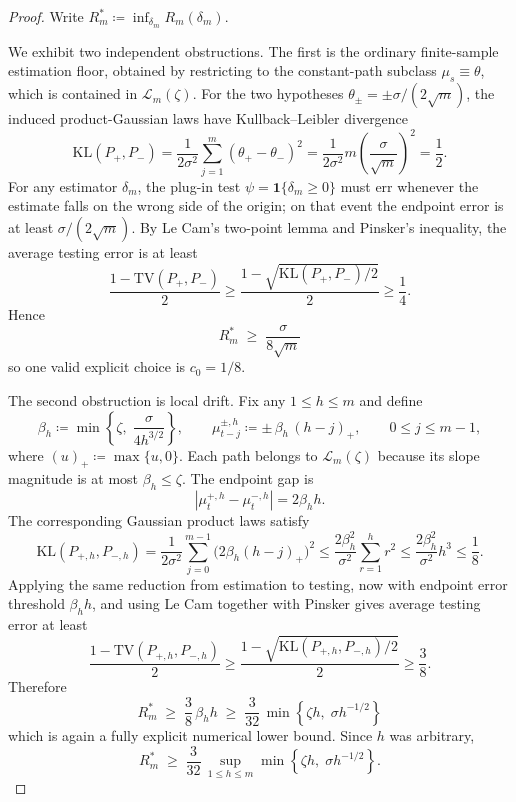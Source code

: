 \begin{proof}
Write $R_m^* \coloneqq \inf_{\delta_m} R_m(\delta_m)$.

We exhibit two independent obstructions. The first is the ordinary
finite-sample estimation floor, obtained by restricting to the constant-path
subclass $\mu_s \equiv \theta$, which is contained in
$\mathcal{L}_m(\zeta)$. For the two hypotheses
$\theta_\pm = \pm \sigma /(2\sqrt{m})$, the induced product-Gaussian laws have
Kullback--Leibler divergence
\[
  \mathrm{KL}(P_+,P_-)
  = \frac{1}{2\sigma^2} \sum_{j=1}^{m} (\theta_+ - \theta_-)^2
  = \frac{1}{2\sigma^2} m\left(\frac{\sigma}{\sqrt{m}}\right)^2
  = \frac{1}{2}.
\]
For any estimator $\delta_m$, the plug-in test $\psi = \mathbf{1}\{\delta_m \geq 0\}$
must err whenever the estimate falls on the wrong side of the origin; on that
event the endpoint error is at least $\sigma /(2\sqrt{m})$. By Le Cam's
two-point lemma and Pinsker's inequality, the average testing error is at least
\[
  \frac{1-\mathrm{TV}(P_+,P_-)}{2}
  \geq
  \frac{1-\sqrt{\mathrm{KL}(P_+,P_-)/2}}{2}
  \geq \frac{1}{4}.
\]
Hence
\[
  R_m^* \;\geq\; \frac{\sigma}{8\sqrt{m}}
\]
so one valid explicit choice is $c_0 = 1/8$.

The second obstruction is local drift. Fix any $1\leq h\leq m$ and define
\[
  \beta_h \coloneqq \min\!\left\{\zeta,\; \frac{\sigma}{4h^{3/2}}\right\},
  \qquad
  \mu^{\pm,h}_{t-j} \coloneqq \pm \,\beta_h\,(h-j)_+,
  \qquad 0\leq j\leq m-1,
\]
where $(u)_+ \coloneqq \max\{u,0\}$. Each path belongs to
$\mathcal{L}_m(\zeta)$ because its slope magnitude is at most $\beta_h \leq
\zeta$. The endpoint gap is
\[
  |\mu_t^{+,h} - \mu_t^{-,h}| = 2\beta_h h.
\]
The corresponding Gaussian product laws satisfy
\[
  \mathrm{KL}(P_{+,h},P_{-,h})
  = \frac{1}{2\sigma^2} \sum_{j=0}^{m-1}
    \bigl(2\beta_h (h-j)_+\bigr)^2
  \leq \frac{2\beta_h^2}{\sigma^2} \sum_{r=1}^{h} r^2
  \leq \frac{2\beta_h^2}{\sigma^2} h^3
  \leq \frac{1}{8}.
\]
Applying the same reduction from estimation to testing, now with endpoint error
threshold $\beta_h h$, and using Le Cam together with Pinsker gives average
testing error at least
\[
  \frac{1-\mathrm{TV}(P_{+,h},P_{-,h})}{2}
  \geq
  \frac{1-\sqrt{\mathrm{KL}(P_{+,h},P_{-,h})/2}}{2}
  \geq \frac{3}{8}.
\]
Therefore
\[
  R_m^* \;\geq\; \frac{3}{8}\,\beta_h h
  \;\geq\;
  \frac{3}{32}\,\min\!\left\{\zeta h,\; \sigma h^{-1/2}\right\}
\]
which is again a fully explicit numerical lower bound. Since $h$ was arbitrary,
\[
  R_m^* \;\geq\;
  \frac{3}{32}\,\sup_{1\leq h\leq m}
  \min\!\left\{\zeta h,\; \sigma h^{-1/2}\right\}.
\]


\end{proof}
